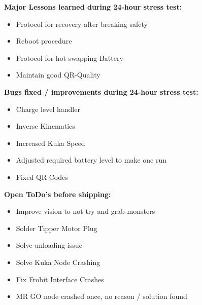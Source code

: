 \textbf{Major Lessons learned during 24-hour stress test:}
\begin{itemize}
\item Protocol for recovery after breaking safety
\item Reboot procedure
\item Protocol for hot-swapping Battery
\item Maintain good QR-Quality
\end{itemize}

\textbf{Bugs fixed / improvements during 24-hour stress test:}
\begin{itemize}
\item Charge level handler
\item Inverse Kinematics
\item Increased Kuka Speed
\item Adjusted required battery level to make one run
\item Fixed QR Codes
\end{itemize}

\textbf{Open ToDo's before shipping:}
\begin{itemize}
\item Improve vision to not try and grab monsters
\item Solder Tipper Motor Plug
\item Solve unloading issue
\item Solve Kuka Node Crashing
\item Fix Frobit Interface Crashes
\item MR GO node crashed once, no reason / solution found
\end{itemize}



